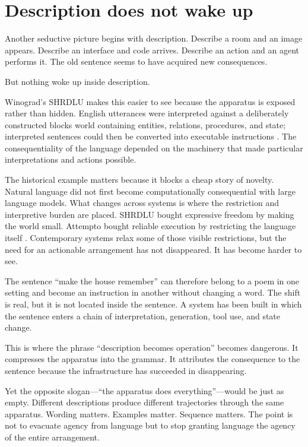 \documentclass[11pt]{article}
\begin{document}
\section{Description does not wake up}

Another seductive picture begins with description. Describe a room and an image appears. Describe an interface and code arrives. Describe an action and an agent performs it. The old sentence seems to have acquired new consequences.

But nothing woke up inside description.

Winograd's SHRDLU makes this easier to see because the apparatus is exposed rather than hidden. English utterances were interpreted against a deliberately constructed blocks world containing entities, relations, procedures, and state; interpreted sentences could then be converted into executable instructions \parencite{winograd1973procedural}. The consequentiality of the language depended on the machinery that made particular interpretations and actions possible.

The historical example matters because it blocks a cheap story of novelty. Natural language did not first become computationally consequential with large language models. What changes across systems is where the restriction and interpretive burden are placed. SHRDLU bought expressive freedom by making the world small. Attempto bought reliable execution by restricting the language itself \parencite{fuchs1996ace}. Contemporary systems relax some of those visible restrictions, but the need for an actionable arrangement has not disappeared. It has become harder to see.

The sentence ``make the house remember'' can therefore belong to a poem in one setting and become an instruction in another without changing a word. The shift is real, but it is not located inside the sentence. A system has been built in which the sentence enters a chain of interpretation, generation, tool use, and state change.

This is where the phrase ``description becomes operation'' becomes dangerous. It compresses the apparatus into the grammar. It attributes the consequence to the sentence because the infrastructure has succeeded in disappearing.

Yet the opposite slogan---``the apparatus does everything''---would be just as empty. Different descriptions produce different trajectories through the same apparatus. Wording matters. Examples matter. Sequence matters. The point is not to evacuate agency from language but to stop granting language the agency of the entire arrangement.
\end{document}
